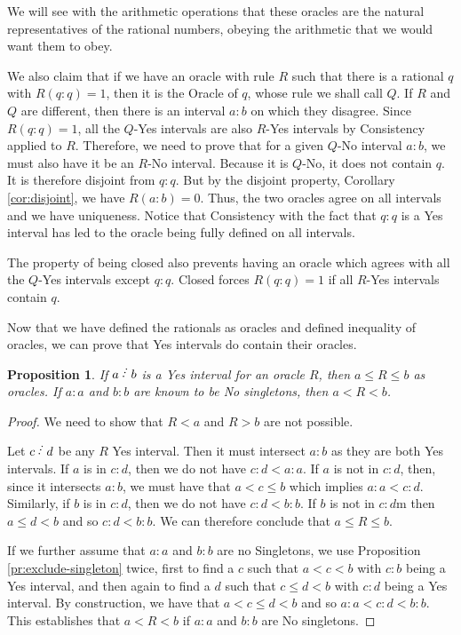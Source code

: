 \documentclass[12pt]{article}
\newtheorem{proposition}{Proposition}[subsection]
\begin{document}
We will see with the arithmetic operations that these oracles are the natural representatives of the rational numbers, obeying the arithmetic that we would want them to obey.  

We also claim that if we have an oracle with rule $R$ such that there is a rational $q$ with $R(q:q)=1$, then it is the Oracle of $q$, whose rule we shall call $Q$. If $R$ and $Q$ are different, then there is an interval $a:b$ on which they disagree. Since $R(q:q) =1$, all the  $Q$-Yes intervals are also $R$-Yes intervals by Consistency applied to $R$. Therefore, we need to prove that for a given  $Q$-No interval $a:b$, we must also have it be an $R$-No interval. Because it is $Q$-No, it does not contain $q$. It is therefore disjoint from $q:q$. But by the disjoint property, Corollary \ref{cor:disjoint}, we have $R(a:b)=0$. Thus, the two oracles agree on all intervals and we have uniqueness. Notice that Consistency with the fact that $q:q$ is a Yes interval has led to the oracle being fully defined on all intervals. 

The property of being closed also prevents having an oracle which agrees with all the $Q$-Yes intervals except $q:q$. Closed forces $R(q:q)=1$ if all $R$-Yes intervals contain $q$.

Now that we have defined the rationals as oracles and defined inequality of oracles, we can prove that Yes intervals do contain their oracles.

\begin{proposition}\label{pr:yes-trap}
    If $a\lte b$ is a Yes interval for an oracle $R$, then $a \leq R \leq b$ as oracles. If $a:a$ and $b:b$ are known to be No singletons, then $a < R < b$.
\end{proposition}

\begin{proof}
    We need to show that $R < a$ and $R > b$ are not possible. 

    Let $c\lte d$ be any $R$ Yes interval. Then it must intersect $a:b$ as they are both Yes intervals. If $a$ is in $c:d$, then we do not have $c:d < a:a$. If $a$ is not in $c:d$, then, since it intersects $a:b$, we must have that $a < c \leq b$ which implies $a:a < c:d$. Similarly, if $b$ is in $c:d$, then we do not have $c:d < b:b$. If $b$ is not in $c:d$m then $a \leq d < b$ and so $c:d < b:b$. We can therefore conclude that $a \leq R \leq b$.

    If we further assume that $a:a$ and $b:b$ are no Singletons, we use Proposition \ref{pr:exclude-singleton} twice, first to find a $c$ such that $a < c < b$ with $c:b$ being a Yes interval, and then again to find a $d$ such that $c \leq d < b$ with $c:d$ being a Yes interval. By construction, we have that $a < c \leq d < b$ and so $a:a < c:d < b:b$. This establishes that $a < R < b$ if $a:a$ and $b:b$ are No singletons.  
\end{proof}
\end{document}
